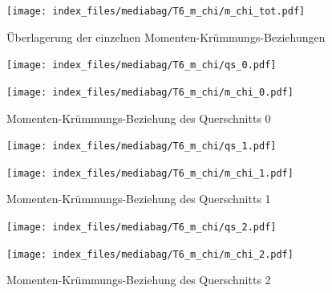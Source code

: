 \documentclass[
  11pt,
  letterpaper,
]{scrreprt}
\begin{document}
\begin{figure}[H]

{\centering \texttt{[image: index\_files/mediabag/T6\_m\_chi/m\_chi\_tot.pdf]}

}

\caption{Überlagerung der einzelnen Momenten-Krümmungs-Beziehungen}

\end{figure}%

\begin{figure}[H]

\begin{minipage}{0.50\linewidth}
\texttt{[image: index\_files/mediabag/T6\_m\_chi/qs\_0.pdf]}\end{minipage}%
%
\begin{minipage}{0.50\linewidth}
\texttt{[image: index\_files/mediabag/T6\_m\_chi/m\_chi\_0.pdf]}\end{minipage}%

\caption{\label{fig-mchi_anhang}Momenten-Krümmungs-Beziehung des
Querschnitts 0}

\end{figure}%

\begin{figure}[H]

\begin{minipage}{0.50\linewidth}
\texttt{[image: index\_files/mediabag/T6\_m\_chi/qs\_1.pdf]}\end{minipage}%
%
\begin{minipage}{0.50\linewidth}
\texttt{[image: index\_files/mediabag/T6\_m\_chi/m\_chi\_1.pdf]}\end{minipage}%

\caption{\label{fig-mchi_anhang}Momenten-Krümmungs-Beziehung des
Querschnitts 1}

\end{figure}%

\begin{figure}[H]

\begin{minipage}{0.50\linewidth}
\texttt{[image: index\_files/mediabag/T6\_m\_chi/qs\_2.pdf]}\end{minipage}%
%
\begin{minipage}{0.50\linewidth}
\texttt{[image: index\_files/mediabag/T6\_m\_chi/m\_chi\_2.pdf]}\end{minipage}%

\caption{\label{fig-mchi_anhang}Momenten-Krümmungs-Beziehung des
Querschnitts 2}

\end{figure}%
\end{document}
